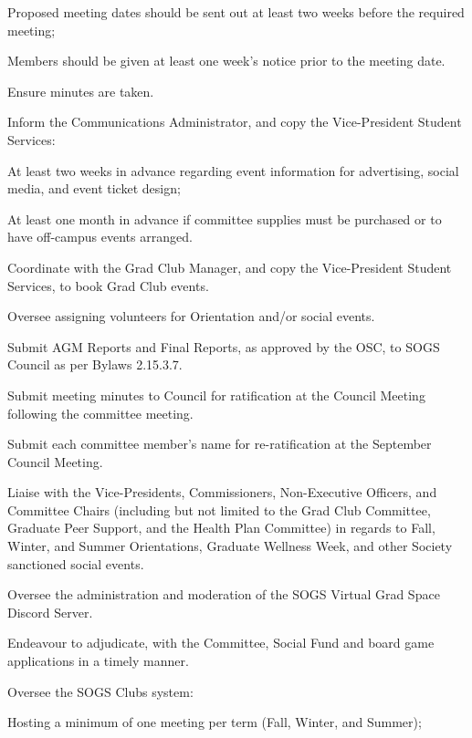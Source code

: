 \begin{longenum}[ label*=\thesubsection.\arabic*., align=left]
\begin{longenum}[label*=\arabic*., align=left]
\begin{longenum}[label*=\arabic*., align=left]
\begin{longenum}[label*=\arabic*., align=left]
				\item Proposed meeting dates should be sent out at least two weeks before the required meeting;
				\item Members should be given at least one week's notice prior to the meeting date.
				\end{longenum}	
			\item Ensure minutes are taken.
			\item Inform the Communications Administrator, and copy the Vice-President Student Services:
				\begin{longenum}[label*=\arabic*., align=left]
				\item At least two weeks in advance regarding event information for advertising, social media, and event ticket design;
				\item At least one month in advance if committee supplies must be purchased or to have off-campus events arranged.
				\end{longenum}	
			\item Coordinate with the Grad Club Manager, and copy the Vice-President Student Services, to book Grad Club events.
			\item Oversee assigning volunteers for Orientation and/or social events.
			\item Submit AGM Reports and Final Reports, as approved by the OSC, to SOGS Council as per Bylaws 2.15.3.7.
			\item Submit meeting minutes to Council for ratification at the Council Meeting following the committee meeting.
			\item Submit each committee member's name for re-ratification at the September Council Meeting.		
			\item Liaise with the Vice-Presidents, Commissioners, Non-Executive Officers, and Committee Chairs (including but not limited to the Grad Club Committee, Graduate Peer Support, and the Health Plan Committee) in regards to Fall, Winter, and Summer Orientations, Graduate Wellness Week, and other Society sanctioned social events.			
			\item Oversee the administration and moderation of the SOGS Virtual Grad Space Discord Server.					
			\item Endeavour to adjudicate, with the Committee, Social Fund and board game applications in a timely manner.
			\item Oversee the SOGS Clubs system:
				\begin{longenum}[label*=\arabic*., align=left]
				\item Hosting a minimum of one meeting per term (Fall, Winter, and Summer);

\end{longenum}
\end{longenum}
\end{longenum}
\end{longenum}
